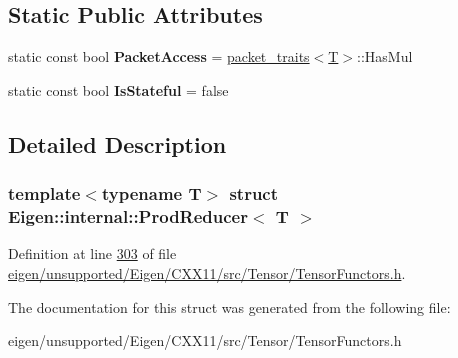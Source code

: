 \subsection*{Static Public Attributes}
\begin{DoxyCompactItemize}
\item 
\mbox{\label{struct_eigen_1_1internal_1_1_prod_reducer_a3e9064e570b42b6a578792f791cc91fa}} 
static const bool {\bfseries Packet\+Access} = \hyperlink{struct_eigen_1_1internal_1_1packet__traits}{packet\+\_\+traits}$<$\hyperlink{group___sparse_core___module}{T}$>$\+::Has\+Mul
\item 
\mbox{\label{struct_eigen_1_1internal_1_1_prod_reducer_ad7e32d1741516cd97bc8e5aecc532824}} 
static const bool {\bfseries Is\+Stateful} = false
\end{DoxyCompactItemize}


\subsection{Detailed Description}
\subsubsection*{template$<$typename T$>$\newline
struct Eigen\+::internal\+::\+Prod\+Reducer$<$ T $>$}



Definition at line \hyperlink{eigen_2unsupported_2_eigen_2_c_x_x11_2src_2_tensor_2_tensor_functors_8h_source_l00303}{303} of file \hyperlink{eigen_2unsupported_2_eigen_2_c_x_x11_2src_2_tensor_2_tensor_functors_8h_source}{eigen/unsupported/\+Eigen/\+C\+X\+X11/src/\+Tensor/\+Tensor\+Functors.\+h}.



The documentation for this struct was generated from the following file\+:\begin{DoxyCompactItemize}
\item 
eigen/unsupported/\+Eigen/\+C\+X\+X11/src/\+Tensor/\+Tensor\+Functors.\+h\end{DoxyCompactItemize}
